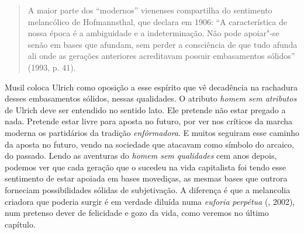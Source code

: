 \begin{quote}
A maior parte dos ``modernos'' vienenses compartilha do sentimento
melancólico de Hofmannsthal, que declara em 1906: ``A característica de
nossa época é a ambiguidade e a indeterminação. Não pode apoiar"-se senão
em bases que afundam, sem perder a consciência de que tudo afunda ali
onde as gerações anteriores acreditavam possuir embasamentos sólidos''
(1993, p. 41).
\end{quote}

Musil coloca Ulrich como oposição a esse espírito que vê decadência na
rachadura desses embasamentos sólidos, nessas qualidades. O atributo
\emph{homem sem atributos} de Ulrich deve ser entendido no sentido lato.
Ele pretende não estar pregado a nada. Pretende estar livre para aposta
no futuro, por ver nos críticos da marcha moderna os partidários da
tradição \emph{enfôrmadora}. E muitos seguiram esse caminho da aposta no
futuro, vendo na sociedade que atacavam como símbolo do arcaico, do
passado. Lendo as aventuras do \emph{homem sem qualidades} cem anos
depois, podemos ver que cada geração que o sucedeu na vida capitalista
foi tendo esse sentimento de estar apoiada em bases movediças, as mesmas
bases que outrora forneciam possibilidades sólidas de subjetivação. A
diferença é que a melancolia criadora que poderia surgir é em verdade
diluída numa \emph{euforia} \emph{perpétua} (, 2002), num
pretenso dever de felicidade e gozo da vida, como veremos no último
capítulo.

